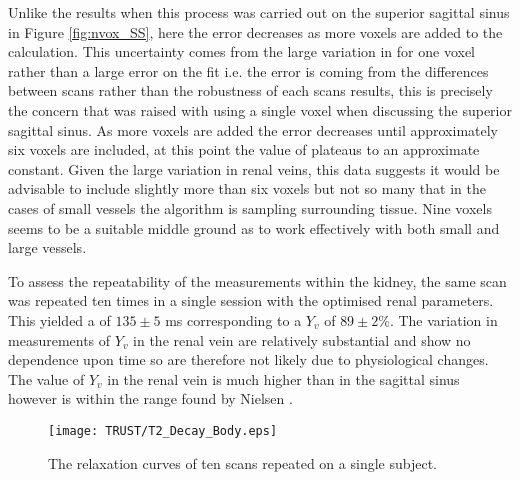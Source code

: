 Unlike the results when this process was carried out on the superior sagittal sinus in Figure \ref{fig:nvox_SS}, here the error decreases as more voxels are added to the calculation. This uncertainty comes from the large variation in \ttwo for one voxel rather than a large error on the fit i.e. the error is coming from the differences between scans rather than the robustness of each scans results, this is precisely the concern that was raised with using a single voxel when discussing the superior sagittal sinus. As more voxels are added the error decreases until approximately six voxels are included, at this point the value of \ttwo plateaus to an approximate constant. Given the large variation in renal veins, this data suggests it would be advisable to include slightly more than six voxels but not so many that in the cases of small vessels the algorithm is sampling surrounding tissue. Nine voxels seems to be a suitable middle ground as to work effectively with both small and large vessels.

To assess the repeatability of the measurements within the kidney, the same scan was repeated ten times in a single session with the optimised renal parameters. This yielded a \ttwo of $135\pm5$ ms corresponding to a $Y_v$ of $89\pm2\%$. The variation in measurements of $Y_v$ in the renal vein are relatively substantial and show no dependence upon time so are therefore not likely due to physiological changes. The value of $Y_v$ in the renal vein is much higher than in the sagittal sinus however is within the range found by Nielsen \cite{nielsen_renal_1992}.

\begin{figure}[H]
	\centering
	\texttt{[image: TRUST/T2\_Decay\_Body.eps]}
	\caption{The \ttwo relaxation curves of ten scans repeated on a single subject.}
	\label{fig:T2_Decay_Body}	
\end{figure}

